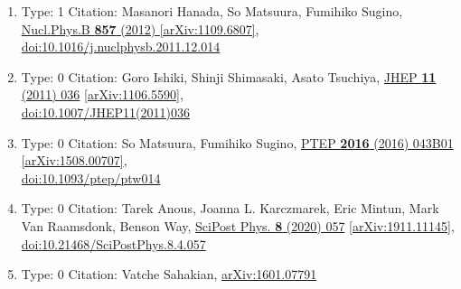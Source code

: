 \documentclass[a4paper,10pt]{article}
\begin{document}
\begin{enumerate}
\begin{enumerate}
  \item Type: 1 Citation: Masanori Hanada, So Matsuura, Fumihiko Sugino, \href{https://www.doi.org/10.1016/j.nuclphysb.2011.12.014}{Nucl.Phys.B {\bf 857} (2012) }  \href{https://arxiv.org/abs/1109.6807}{[arXiv:1109.6807]},\\\href{https://www.doi.org/10.1016/j.nuclphysb.2011.12.014}{doi:10.1016/j.nuclphysb.2011.12.014}
  \item Type: 0 Citation: Goro Ishiki, Shinji Shimasaki, Asato Tsuchiya, \href{https://www.doi.org/10.1007/JHEP11(2011)036}{JHEP {\bf 11} (2011) 036}  \href{https://arxiv.org/abs/1106.5590}{[arXiv:1106.5590]},\\\href{https://www.doi.org/10.1007/JHEP11(2011)036}{doi:10.1007/JHEP11(2011)036}
  \item Type: 0 Citation: So Matsuura, Fumihiko Sugino, \href{https://www.doi.org/10.1093/ptep/ptw014}{PTEP {\bf 2016} (2016) 043B01}  \href{https://arxiv.org/abs/1508.00707}{[arXiv:1508.00707]},\\\href{https://www.doi.org/10.1093/ptep/ptw014}{doi:10.1093/ptep/ptw014}
  \item Type: 0 Citation: Tarek Anous, Joanna L. Karczmarek, Eric Mintun, Mark Van Raamsdonk, Benson Way, \href{https://www.doi.org/10.21468/SciPostPhys.8.4.057}{SciPost Phys. {\bf 8} (2020) 057}  \href{https://arxiv.org/abs/1911.11145}{[arXiv:1911.11145]},\\\href{https://www.doi.org/10.21468/SciPostPhys.8.4.057}{doi:10.21468/SciPostPhys.8.4.057}
  \item Type: 0 Citation: Vatche Sahakian, \href{https://arxiv.org/abs/1601.07791}{arXiv:1601.07791}

\end{enumerate}
\end{enumerate}
\end{document}
